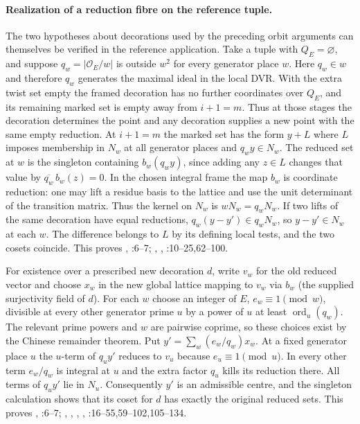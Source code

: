\paragraph{Realization of a reduction fibre on the reference tuple.}
The two hypotheses about decorations used by the preceding orbit arguments
can themselves be verified in the reference application.
Take a tuple with $Q_E=\varnothing$, and suppose
$q_w=|\mathcal O_E/w|$ is outside $w^2$ for every generator place $w$.
Here $q_w\in w$ and therefore $q_w$ generates the maximal ideal in the
local DVR. With the extra twist set empty the framed decoration has no
further coordinates over $Q_E$, and its remaining marked set is empty
away from $i+1=m$. Thus at those stages the decoration determines the
point and any decoration supplies a new point with the same empty
reduction. At $i+1=m$ the marked set has the form $y+L$ where $L$
imposes membership in $N_w$ at all generator places and $q_w y\in N_w$.
The reduced set at $w$ is the singleton containing $b_w(q_w y)$,
since adding any $z\in L$ changes that value by
$\overline{q_w}\,b_w(z)=0$. In the chosen integral frame the map $b_w$
is coordinate reduction: one may lift a residue basis to the lattice
and use the unit determinant of the transition matrix. Thus the kernel
on $N_w$ is $wN_w=q_wN_w$. If two lifts of the same decoration have
equal reductions, $q_w(y-y')\in q_wN_w$, so $y-y'\in N_w$ at each
$w$. The difference belongs to $L$ by its defining local tests, and the
two cosets coincide. This proves
,
:6--7;
, ,
:10--25,62--100.

For existence over a prescribed new decoration $d$, write $v_w$ for the
old reduced vector and choose $x_w$ in the new global lattice mapping to
$v_w$ via $b_w$ (the supplied surjectivity field of $d$).
For each $w$ choose an integer of $E$, $e_w\equiv1\pmod w$, divisible
at every other generator prime $u$ by a power of $u$ at least
$\operatorname{ord}_u(q_w)$. The relevant prime powers and $w$ are
pairwise coprime, so these choices exist by the Chinese remainder theorem.
Put $y'=\sum_w(e_w/q_w)x_w$. At a fixed generator place $u$ the
$u$-term of $q_u y'$ reduces to $v_u$ because $e_u\equiv1\pmod u$.
In every other term $e_w/q_w$ is integral at $u$ and the extra factor
$q_u$ kills its reduction there. All terms of $q_u y'$ lie in $N_u$.
Consequently $y'$ is an admissible centre, and the singleton calculation
shows that its coset for $d$ has exactly the original reduced sets.
This proves ,
:6--7;
, , ,
,
:16--55,59--102,105--134.

